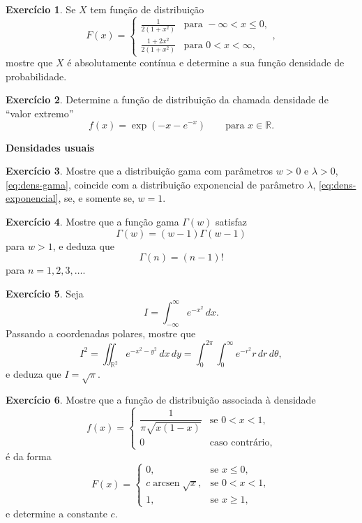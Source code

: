 \documentclass[12pt,portuguese]{article}
\theoremstyle{definition}
\theoremstyle{plainexercise}
\newtheorem{exercise}{Exercício}
\theoremstyle{starredexercise}
\theoremstyle{definition}
\begin{document}
\begin{exercise}
\label{exercise:fd-por-partes}
  Se $X$ tem função de distribuição
  \[
    F(x) = \begin{cases} \frac{1}{2(1+x^2)} & \text{para } -\infty < x
      \leqslant 0, \\[0.2cm] \frac{1+2x^2}{2(1+x^2)} & \text{para } 0 < x <
      \infty, \end{cases},
  \]
  mostre que $X$ é absolutamente contínua e determine a sua função densidade de
  probabilidade.
\end{exercise}

\begin{exercise}
\label{exercise:densidade-valor-extremo}
  Determine a função de distribuição da chamada densidade de ``valor
  extremo''
  \[
    f(x) = \exp(-x - e^{-x}) \qquad \text{para } x \in \mathbb{R}.
  \]
\end{exercise}

\medskip
\noindent\textbf{Densidades usuais}

\begin{exercise}
  \label{exercise:gama-exponencial}
  Mostre que a distribuição gama com parâmetros $w>0$ e $\lambda>0$,
  \eqref{eq:dens-gama}, coincide com a distribuição exponencial de parâmetro
  $\lambda$, \eqref{eq:dens-exponencial}, se, e somente se, $w=1$.
\end{exercise}

\begin{exercise}
  \label{exercise:funcao-gama-recorrencia}
  Mostre que a função gama $\Gamma(w)$ satisfaz
  \[
    \Gamma(w) = (w - 1)\Gamma(w - 1)
  \]
  para $w > 1$, e deduza que
  \[
    \Gamma(n) = (n - 1)!
  \]
  para $n = 1, 2, 3, \ldots$.
\end{exercise}

\begin{exercise}
  \label{exercise:integral-gaussiana}
  Seja
  \[
    I = \int_{-\infty}^{\infty} e^{-x^2}\,dx.
  \]
  Passando a coordenadas polares, mostre que
  \[
    I^2 = \iint_{\mathbb{R}^2} e^{-x^2 - y^2}\,dx\,dy
        = \int_{0}^{2\pi} \int_{0}^{\infty} e^{-r^2} r\,dr\,d\theta,
  \]
  e deduza que $I = \sqrt{\pi}$.
\end{exercise}

\begin{exercise}
  \label{exercise:densidade-arcoseno}
  Mostre que a função de distribuição associada à densidade
  \[
    f(x) = \begin{cases}
      \dfrac{1}{\pi\sqrt{x(1 - x)}} & \text{se } 0 < x < 1, \\[0.3cm]
      0 & \text{caso contrário},
    \end{cases}
  \]
  é da forma
  \[
    F(x) =
    \begin{cases}
      0, & \text{se } x\leqslant 0,\\[0.2cm]
      c\operatorname{arcsen}\sqrt{x}, & \text{se } 0<x<1,\\[0.2cm]
      1, & \text{se } x\geqslant 1,
    \end{cases}
  \]
  e determine a constante $c$.
\end{exercise}
\end{document}
